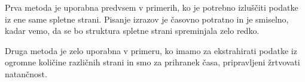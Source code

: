 \documentclass[conference]{IEEEtran}
\begin{document}
	Prva metoda je uporabna predvsem v primerih, ko je potrebno izluščiti podatke iz ene same spletne strani. Pisanje izrazov je časovno potratno in je smiselno, kadar vemo, da se bo struktura spletne strani spreminjala zelo redko.
	
	Druga metoda je zelo uporabna v primeru, ko imamo za ekstrahirati podatke iz ogromne količine različnih strani in smo za prihranek časa, pripravljeni žrtvovati natančnost.
	
	
	
	
\end{document}
